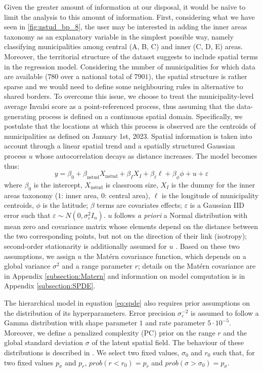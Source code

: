 \documentclass{article}%
\begin{document}
Given the greater amount of information at our disposal, it would be na{\"i}ve to limit the analysis to this amount of information. First, considering what we have seen in \ref{fig:nstud_bp_8}, the user may be interested in adding the inner areas taxonomy as an explanatory variable in the simplest possible way, namely classifying municipalities among central (A, B, C) and inner (C, D, E) areas. Moreover, the territorial structure of the dataset suggests to include spatial terms in the regression model. Considering the number of municipalities for which data are available ($780$ over a national total of $7901$), the spatial structure is rather sparse and we would need to define some neighbouring rules in alternative to shared borders. To overcome this issue, we choose to treat the municipality-level average Invalsi score as a point-referenced process, thus assuming that the data-generating process is defined on a continuous spatial domain. Specifically, we postulate that the locations at which this process is observed are the centroids of municipalities as defined on January 1st, 2023.
Spatial information is taken into account through a linear spatial trend and a spatially structured Gaussian process $u$ whose autocorrelation decays as distance increases. The model becomes thus:
%
\begin{equation}
y = \beta_0 + \beta_\mathrm{nstud} X_\mathrm{nstud} + \beta_{I} X_{I} + \beta_{\ell} \ell +\beta_{\phi} \phi + u + \varepsilon
\label{eq:spde}
\end{equation}
%
where $\beta_0$ is the intercept, $X_\mathrm{nstud}$ is classroom size, $X_I$ is the dummy for the inner areas taxonomy ($1$: inner area, $0$: central area), $\ell$ is the longitude of municipality centroids, $\phi$ is the latitude; $\beta$ terms are covariates effects; $\varepsilon$ is a Gaussian IID error such that $\varepsilon \sim N  (0, \sigma_{\varepsilon}^2 I_n)$. $u$ follows \textit{a priori} a Normal distribution with mean zero and covariance matrix whose elements depend on the distance between the two corresponding points, but not on the direction of their link (isotropy); second-order stationarity is additionally assumed for $u$ \citep[][ Section 2.1]{Banerjee}. Based on these two assumptions, we assign $u$ the Matérn covariance function, which depends on a global variance $\sigma^2$ and a range parameter $r$; details on the Matérn covariance are in Appendix \ref{subsection:Matern} and information on model computation is in Appendix \ref{subsection:SPDE}.

The hierarchical model in equation \ref{eq:spde} also requires prior assumptions on the distribution of its hyperparameters. Error precision $\sigma_{\varepsilon}^{-2}$ is assumed to follow a Gamma distribution with shape parameter $1$ and rate parameter $ 5 \cdot 10^{-5}$. Moreover, we define a penalized complexity (PC) prior \citep{PC} on the range $r$ and the global standard deviation $\sigma$ of the latent spatial field. The behaviour of these distributions is described in \cite{SPDEPC}. We select two fixed values, $\sigma_0$ and $r_0$ such that, for two fixed values $p_\sigma$ and $p_r$, $prob \left( r < r_0 \right) = p_r $ and $prob \left( \sigma > \sigma_0 \right) = p_\sigma$. 
\end{document}
